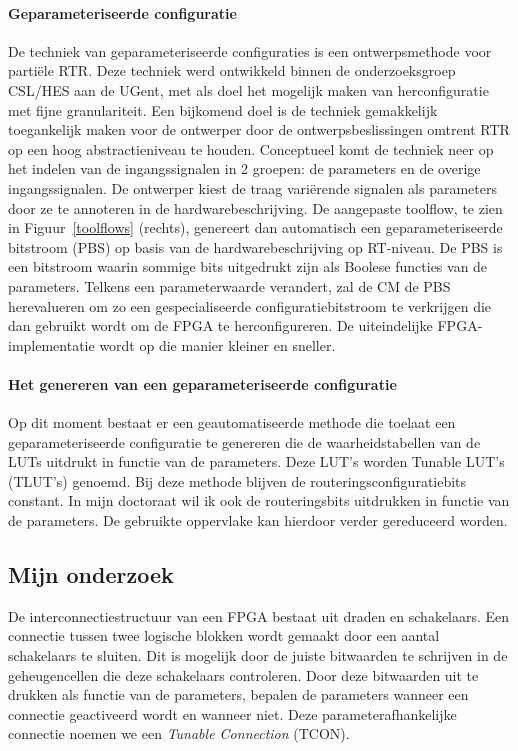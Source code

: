 \documentclass[a4paper,oneside,12pt]{article}
\begin{document}
\paragraph{Geparameteriseerde configuratie}
De techniek van geparameteriseerde configuraties is een ontwerpsmethode voor parti\"ele RTR. Deze techniek werd ontwikkeld binnen de onderzoeksgroep CSL/HES aan de UGent, met als doel het mogelijk maken van herconfiguratie met fijne granulariteit. Een bijkomend doel  is de techniek gemakkelijk toegankelijk maken voor de ontwerper door de ontwerpsbeslissingen omtrent RTR op een hoog abstractieniveau te houden. Conceptueel komt de techniek neer op het indelen van de ingangssignalen in 2 groepen: de parameters en de overige ingangssignalen. De ontwerper kiest de traag vari\"erende signalen als parameters door ze te annoteren in de hardwarebeschrijving. De aangepaste toolflow, te zien in Figuur~\ref{toolflows} (rechts), genereert dan automatisch een geparameteriseerde bitstroom (PBS) op basis van de hardwarebeschrijving op RT-niveau. De PBS is een bitstroom waarin sommige bits uitgedrukt zijn als Boolese functies van de parameters. Telkens een parameterwaarde verandert, zal de CM de PBS herevalueren om zo een gespecialiseerde configuratiebitstroom te verkrijgen die dan gebruikt wordt om de FPGA te herconfigureren. De uiteindelijke FPGA-implementatie wordt op die manier kleiner en sneller.

\paragraph{Het genereren van een geparameteriseerde configuratie}

Op dit moment bestaat er een geautomatiseerde methode die toelaat een geparameteriseerde configuratie te genereren die de waarheidstabellen van de LUTs uitdrukt in functie van de parameters. Deze LUT's worden Tunable LUT's (TLUT's) genoemd. Bij deze methode blijven de routeringsconfiguratiebits constant. In mijn doctoraat wil ik ook de routeringsbits uitdrukken in functie van de parameters. De gebruikte oppervlake kan hierdoor verder gereduceerd worden.

\subsection{Mijn onderzoek}

De interconnectiestructuur van een FPGA bestaat uit draden en schakelaars. Een connectie tussen twee logische blokken wordt gemaakt door een aantal schakelaars te sluiten. Dit is mogelijk door de juiste bitwaarden te schrijven in de geheugencellen die deze schakelaars controleren. Door deze bitwaarden uit te drukken als functie van de parameters, bepalen de parameters wanneer een connectie geactiveerd wordt en wanneer niet. Deze parameterafhankelijke connectie noemen we een {\em Tunable Connection} (TCON). 
\end{document}
